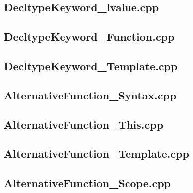 \documentclass[11pt]{report}
\begin{document}
\begin{appendix}
\subsection{DecltypeKeyword\_lvalue.cpp}
\label{DecltypeKeyword_lvalue}


\subsection{DecltypeKeyword\_Function.cpp}
\label{DecltypeKeyword_Function}


\subsection{DecltypeKeyword\_Template.cpp}
\label{DecltypeKeyword_Template}


\subsection{AlternativeFunction\_Syntax.cpp}
\label{AlternativeFunction_Syntax}


\subsection{AlternativeFunction\_This.cpp}
\label{AlternativeFunction_This}


\subsection{AlternativeFunction\_Template.cpp}
\label{AlternativeFunction_Template}


\subsection{AlternativeFunction\_Scope.cpp}
\label{AlternativeFunction_Scope}



\end{appendix}
\end{document}
